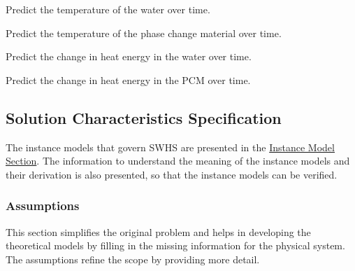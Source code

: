 \documentclass[12pt]{article}
\begin{document}
\begin{description}[font=\normalfont]
\item[Predict-Water-Temperature:\phantomsection\label{waterTempGS}]{Predict the temperature of the water over time.}
\item[Predict-PCM-Temperature:\phantomsection\label{pcmTempGS}]{Predict the temperature of the phase change material over time.}
\item[Predict-Water-Energy:\phantomsection\label{waterEnergyGS}]{Predict the change in heat energy in the water over time.}
\item[Predict-PCM-Energy:\phantomsection\label{pcmEnergyGS}]{Predict the change in heat energy in the PCM over time.}
\end{description}
\subsection{Solution Characteristics Specification}
\label{Sec:SolCharSpec}
The instance models that govern SWHS are presented in the \hyperref[Sec:IMs]{Instance Model Section}. The information to understand the meaning of the instance models and their derivation is also presented, so that the instance models can be verified.

\subsubsection{Assumptions}
\label{Sec:Assumps}
This section simplifies the original problem and helps in developing the theoretical models by filling in the missing information for the physical system. The assumptions refine the scope by providing more detail.
\end{document}
